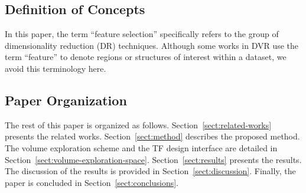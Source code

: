 \subsection{Definition of Concepts}
In this paper, the term ``feature selection'' specifically refers to the group of dimensionality reduction (DR) techniques. Although some works in DVR use the term ``feature'' to denote regions or structures of interest within a dataset, we avoid this terminology here.

\subsection{Paper Organization}
The rest of this paper is organized as follows. Section~\ref{sect:related-works} presents the related works. Section~\ref{sect:method} describes the proposed method. The volume exploration scheme and the TF design interface are detailed in Section~\ref{sect:volume-exploration-space}. Section~\ref{sect:results} presents the results. The discussion of the results is provided in Section~\ref{sect:discussion}. Finally, the paper is concluded in Section~\ref{sect:conclusions}.